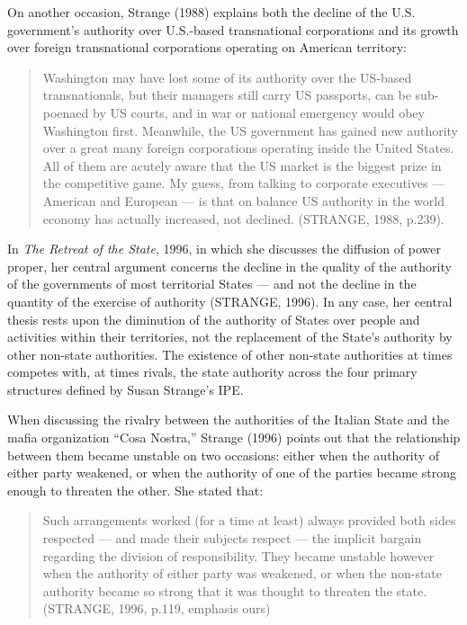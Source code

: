 On another occasion, Strange (1988) explains both the decline of the U.S. government's authority over U.S.-based transnational corporations and its growth over foreign transnational corporations operating on American territory:

\begin{quote}
Washington may have lost some of its authority over the US-based transnationals, but their managers still carry US passports, can be sub-poenaed by US courts, and in war or national emergency would obey Washington first. Meanwhile, the US government has gained new authority over a great many foreign corporations operating inside the United States. All of them are acutely aware that the US market is the biggest prize in the competitive game. My guess, from talking to corporate executives --- American and European --- is that on balance US authority in the world economy has actually increased, not declined. (STRANGE, 1988, p.239).
\end{quote}

In \textit{The Retreat of the State}, 1996, in which she discusses the diffusion of power proper, her central argument concerns the decline in the quality of the authority of the governments of most territorial States --- and not the decline in the quantity of the exercise of authority (STRANGE, 1996). In any case, her central thesis rests upon the diminution of the authority of States over people and activities within their territories, not the replacement of the State's authority by other non-state authorities. The existence of other non-state authorities at times competes with, at times rivals, the state authority across the four primary structures defined by Susan Strange's IPE.

When discussing the rivalry between the authorities of the Italian State and the mafia organization ``Cosa Nostra,'' Strange (1996) points out that the relationship between them became unstable on two occasions: either when the authority of either party weakened, or when the authority of one of the parties became strong enough to threaten the other. She stated that:

\begin{quote}
Such arrangements worked (for a time at least) always provided both sides respected --- and made their subjects respect --- the implicit bargain regarding the division of responsibility. They became unstable however when the authority of either party was weakened, or when the non-state authority became so strong that it was thought to threaten the state. (STRANGE, 1996, p.119, emphasis ours)
\end{quote}

